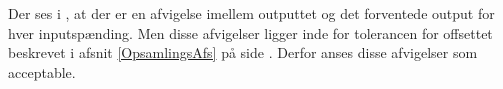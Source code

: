 Der ses i , at der er en afvigelse imellem outputtet og det forventede output for hver inputspænding. Men disse afvigelser ligger inde for tolerancen for offsettet beskrevet i afsnit \ref{OpsamlingsAfs} på side \pageref{OpsamlingsAfs}. Derfor anses disse afvigelser som acceptable.